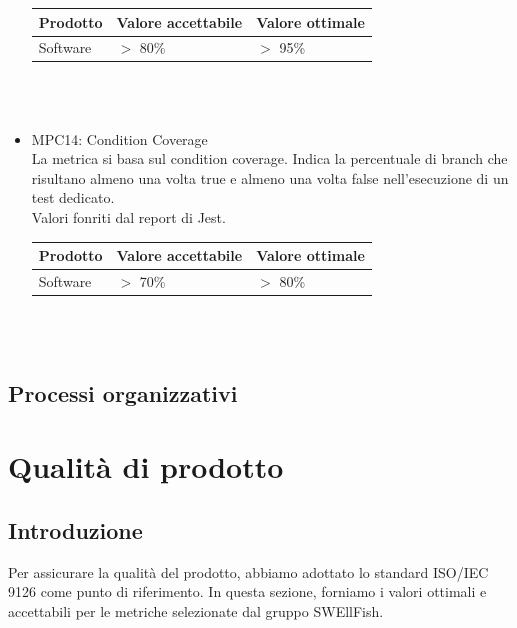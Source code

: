 \documentclass[12pt]{article}
\begin{document}
\begin{itemize}
	      \begin{center}
		      \begin{tabularx}{\textwidth}{|X|X|X|}
			      \hline
			      \textbf{Prodotto} & \textbf{Valore accettabile } & \textbf{Valore ottimale } \\
			      \hline
			      Software          & $>$ 80\%                     & $>$ 95\%                  \\
			      \hline
		      \end{tabularx}\\[8pt]
		      \mbox{}\\
	      \end{center}

	\item MPC14: Condition Coverage \\
	      La metrica si basa sul condition coverage. Indica la percentuale di branch che risultano almeno una volta true e almeno una volta false nell'esecuzione di un test dedicato. \\
	      Valori fonriti dal report di Jest.

	      \begin{center}
		      \begin{tabularx}{\textwidth}{|X|X|X|}
			      \hline
			      \textbf{Prodotto} & \textbf{Valore accettabile } & \textbf{Valore ottimale } \\
			      \hline
			      Software          & $>$ 70\%                     & $>$ 80\%                  \\
			      \hline
		      \end{tabularx}\\[8pt]
		      \mbox{}\\
	      \end{center}

\end{itemize}


\subsection{Processi organizzativi}

\section{Qualità di prodotto}
\subsection{Introduzione}
Per assicurare la qualità del prodotto, abbiamo adottato lo standard ISO/IEC 9126 come punto di riferimento. In questa sezione, forniamo i valori ottimali e accettabili per le metriche selezionate dal gruppo SWEllFish.
\end{document}
